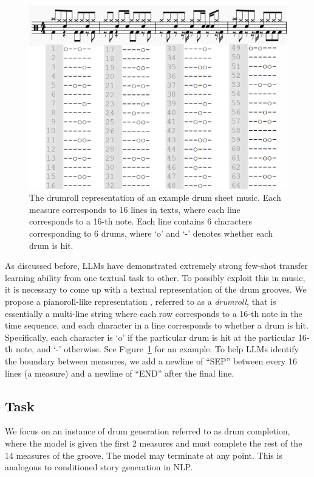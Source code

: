 \documentclass[letterpaper]{article} %
\begin{document}
\begin{figure}[t!]
    \centering
    \includegraphics[scale=0.46]{images/drumroll.png}
    \caption{The drumroll representation of an example drum sheet music. Each measure corresponds to 16 lines in texts, where each line corresponds to a 16-th note. Each line contains 6 characters corresponding to 6 drums, where `o' and `-' denotes whether each drum is hit.}
    \label{fig:drumroll}
\end{figure}

As discussed before, LLMs have demonstrated extremely strong few-shot transfer learning ability from one textual task to other. To possibly exploit this in music, it is necessary to come up with a textual representation of the drum grooves. We propose a pianoroll-like representation \cite{brunner2018symbolic}, referred to as a \textit{drumroll}, that is essentially a multi-line string where each row corresponds to a 16-th note in the time sequence, and each character in a line corresponds to whether a drum is hit. Specifically, each character is `o' if the particular drum is hit at the particular 16-th note, and `-' otherwise. See Figure~\ref{fig:drumroll} for an example. To help LLMs identify the boundary between measures, we add a newline of ``SEP'' between every 16 lines (a measure) and a newline of ``END'' after the final line.

\subsection{Task}
We focus on an instance of drum generation referred to as drum completion, where the model is given the first 2 measures and must complete the rest of the 14 measures of the groove. The model may terminate at any point. This is analogous to conditioned story generation in NLP.
\end{document}
